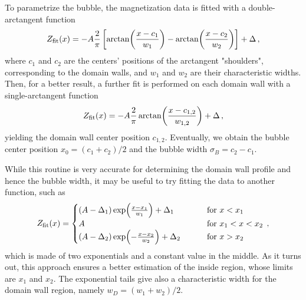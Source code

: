 To parametrize the bubble, the magnetization data is fitted with a double-arctangent function
\begin{equation}
    Z_{\rm fit}(x) = -A\frac{2}{\pi} \left[\arctan(\frac{x-c_1}{w_1}) - \arctan(\frac{x-c_2}{w_2})\right] + \Delta\, ,
    \label{eq:double-atan}
\end{equation}
where $c_1$ and $c_2$ are the centers' positions of the arctangent "shoulders", corresponding to the domain walls, and $w_1$ and $w_2$ are their characteristic widths. 
Then, for a better result, a further fit is performed on each domain wall with a single-arctangent function
\begin{equation}
    Z_{\rm fit}(x) = -A \frac{2}{\pi}\arctan(\frac{x-c_{1,2}}{w_{1,2}}) + \Delta\, ,
    \label{eq:atan}
\end{equation}
yielding the domain wall center position $c_{1,2}$. Eventually, we obtain the bubble center position $x_0 = (c_1 + c_2)/2$ and the bubble width $\sigma_B = c_2 - c_1$.

While this routine is very accurate for determining the domain wall profile and hence the bubble width, it may be useful to try fitting the data to another function, such as
\begin{equation}
    Z_{\rm fit}(x) = 
    \begin{cases}
        (A-\Delta_1) \exp(\frac{x-x_1}{w_1}) + \Delta_1 \qquad\quad &\text{for } x < x_1\\
        A \qquad\qquad\qquad\qquad &\text{for } x_1 < x < x_2\\
        (A-\Delta_2) \exp(-\frac{x-x_2}{w_2}) + \Delta_2 \qquad &\text{for } x > x_2
    \end{cases}\, ,
    \label{eq:fit_exp}
\end{equation}
which is made of two exponentials and a constant value in the middle. As it turns out, this approach ensures a better estimation of the inside region, whose limits are $x_1$ and $x_2$. The exponential tails give also a characteristic width for the domain wall region, namely $w_D = (w_1 + w_2)/2$.

